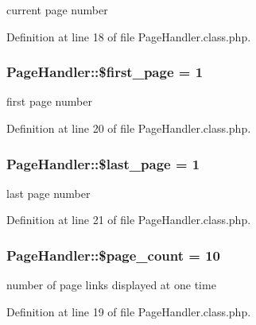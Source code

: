 current page number 



Definition at line 18 of file Page\+Handler.\+class.\+php.

\hypertarget{classPageHandler_adee671fac811b630df2886a43108b5ff}{}
\subsubsection[{\$first\+\_\+page}]{\setlength{\rightskip}{0pt plus 5cm}Page\+Handler\+::\$first\+\_\+page = 1}\label{classPageHandler_adee671fac811b630df2886a43108b5ff}


first page number 



Definition at line 20 of file Page\+Handler.\+class.\+php.

\hypertarget{classPageHandler_ad0a035b1ac1f86fe173d5ea4e8c2bef7}{}
\subsubsection[{\$last\+\_\+page}]{\setlength{\rightskip}{0pt plus 5cm}Page\+Handler\+::\$last\+\_\+page = 1}\label{classPageHandler_ad0a035b1ac1f86fe173d5ea4e8c2bef7}


last page number 



Definition at line 21 of file Page\+Handler.\+class.\+php.

\hypertarget{classPageHandler_a48a16aadd0c373c8856df7df954f90ff}{}
\subsubsection[{\$page\+\_\+count}]{\setlength{\rightskip}{0pt plus 5cm}Page\+Handler\+::\$page\+\_\+count = 10}\label{classPageHandler_a48a16aadd0c373c8856df7df954f90ff}


number of page links displayed at one time 



Definition at line 19 of file Page\+Handler.\+class.\+php.

\hypertarget{classPageHandler_a82a9b55cb98e79d46e6c6648cd2fca26}{}
